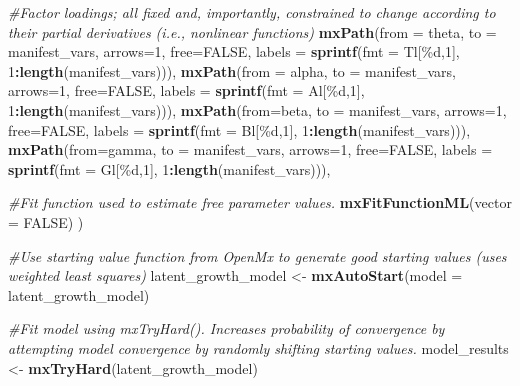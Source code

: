 \documentclass[
12pt, %
twoside,
english]{guelphthesis}
\newenvironment{Shaded}{\begin{snugshade}}{\end{snugshade}}
\newcommand{\AttributeTok}[1]{\textcolor[rgb]{0.13,0.29,0.53}{#1}}
\newcommand{\CommentTok}[1]{\textcolor[rgb]{0.56,0.35,0.01}{\textit{#1}}}
\newcommand{\ConstantTok}[1]{\textcolor[rgb]{0.56,0.35,0.01}{#1}}
\newcommand{\DecValTok}[1]{\textcolor[rgb]{0.00,0.00,0.81}{#1}}
\newcommand{\FunctionTok}[1]{\textcolor[rgb]{0.13,0.29,0.53}{\textbf{#1}}}
\newcommand{\NormalTok}[1]{#1}
\newcommand{\OtherTok}[1]{\textcolor[rgb]{0.56,0.35,0.01}{#1}}
\newcommand{\SpecialCharTok}[1]{\textcolor[rgb]{0.81,0.36,0.00}{\textbf{#1}}}
\newcommand{\StringTok}[1]{\textcolor[rgb]{0.31,0.60,0.02}{#1}}
\begin{document}
\begin{Shaded}
\begin{Highlighting}[numbers=left,,]
  \CommentTok{\#Factor loadings; all fixed and, importantly, constrained to change according to their partial derivatives (i.e., nonlinear functions) }
  \FunctionTok{mxPath}\NormalTok{(}\AttributeTok{from =} \StringTok{\textquotesingle{}theta\textquotesingle{}}\NormalTok{, }\AttributeTok{to =}\NormalTok{ manifest\_vars, }\AttributeTok{arrows=}\DecValTok{1}\NormalTok{, }\AttributeTok{free=}\ConstantTok{FALSE}\NormalTok{,  }
         \AttributeTok{labels =} \FunctionTok{sprintf}\NormalTok{(}\AttributeTok{fmt =} \StringTok{\textquotesingle{}Tl[\%d,1]\textquotesingle{}}\NormalTok{, }\DecValTok{1}\SpecialCharTok{:}\FunctionTok{length}\NormalTok{(manifest\_vars))),}
  \FunctionTok{mxPath}\NormalTok{(}\AttributeTok{from =} \StringTok{\textquotesingle{}alpha\textquotesingle{}}\NormalTok{, }\AttributeTok{to =}\NormalTok{ manifest\_vars, }\AttributeTok{arrows=}\DecValTok{1}\NormalTok{, }\AttributeTok{free=}\ConstantTok{FALSE}\NormalTok{,  }
         \AttributeTok{labels =} \FunctionTok{sprintf}\NormalTok{(}\AttributeTok{fmt =} \StringTok{\textquotesingle{}Al[\%d,1]\textquotesingle{}}\NormalTok{, }\DecValTok{1}\SpecialCharTok{:}\FunctionTok{length}\NormalTok{(manifest\_vars))), }
  \FunctionTok{mxPath}\NormalTok{(}\AttributeTok{from=}\StringTok{\textquotesingle{}beta\textquotesingle{}}\NormalTok{, }\AttributeTok{to =}\NormalTok{ manifest\_vars, }\AttributeTok{arrows=}\DecValTok{1}\NormalTok{,  }\AttributeTok{free=}\ConstantTok{FALSE}\NormalTok{,}
         \AttributeTok{labels =}  \FunctionTok{sprintf}\NormalTok{(}\AttributeTok{fmt =} \StringTok{\textquotesingle{}Bl[\%d,1]\textquotesingle{}}\NormalTok{, }\DecValTok{1}\SpecialCharTok{:}\FunctionTok{length}\NormalTok{(manifest\_vars))), }
  \FunctionTok{mxPath}\NormalTok{(}\AttributeTok{from=}\StringTok{\textquotesingle{}gamma\textquotesingle{}}\NormalTok{, }\AttributeTok{to =}\NormalTok{ manifest\_vars, }\AttributeTok{arrows=}\DecValTok{1}\NormalTok{,  }\AttributeTok{free=}\ConstantTok{FALSE}\NormalTok{,}
         \AttributeTok{labels =}  \FunctionTok{sprintf}\NormalTok{(}\AttributeTok{fmt =} \StringTok{\textquotesingle{}Gl[\%d,1]\textquotesingle{}}\NormalTok{, }\DecValTok{1}\SpecialCharTok{:}\FunctionTok{length}\NormalTok{(manifest\_vars))), }
  
  \CommentTok{\#Fit function used to estimate free parameter values. }
  \FunctionTok{mxFitFunctionML}\NormalTok{(}\AttributeTok{vector =} \ConstantTok{FALSE}\NormalTok{)}
\NormalTok{)}

\CommentTok{\#Use starting value function from OpenMx to generate good starting values (uses weighted least squares)}
\NormalTok{latent\_growth\_model }\OtherTok{\textless{}{-}} \FunctionTok{mxAutoStart}\NormalTok{(}\AttributeTok{model =}\NormalTok{ latent\_growth\_model)}

\CommentTok{\#Fit model using mxTryHard(). Increases probability of convergence by attempting model convergence by randomly shifting starting values. }
\NormalTok{model\_results }\OtherTok{\textless{}{-}} \FunctionTok{mxTryHard}\NormalTok{(latent\_growth\_model)}
\end{Highlighting}
\end{Shaded}
\end{document}
